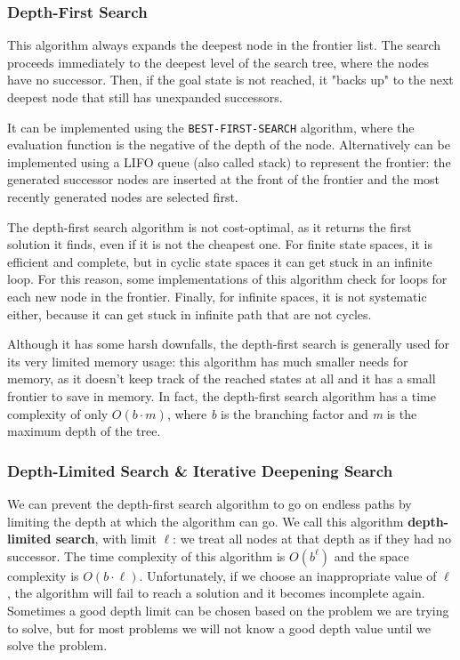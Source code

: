 \documentclass{article}
\begin{document}
\subsubsection{Depth-First Search}
This algorithm always expands the deepest node in the frontier list. The search proceeds immediately to the deepest level of the search tree, where the nodes have no successor. Then, if the goal state is not reached, it "backs up" to the next deepest node that still has unexpanded successors. 

It can be implemented using the \lstinline{BEST-FIRST-SEARCH} algorithm, where the evaluation function is the negative of the depth of the node. Alternatively can be implemented using a LIFO queue (also called stack) to represent the frontier: the generated successor nodes are inserted at the front of the frontier and the most recently generated nodes are selected first.

The depth-first search algorithm is not cost-optimal, as it returns the first solution it finds, even if it is not the cheapest one. For finite state spaces, it is efficient and complete, but in cyclic state spaces it can get stuck in an infinite loop. For this reason, some implementations of this algorithm check for loops for each new node in the frontier. Finally, for infinite spaces, it is not systematic either, because it can get stuck in infinite path that are not cycles.

Although it has some harsh downfalls, the depth-first search is generally used for its very limited memory usage: this algorithm has much smaller needs for memory, as it doesn't keep track of the reached states at all and it has a small frontier to save in memory. In fact, the depth-first search algorithm has a time complexity of only \(O(b\cdot m)\), where \textit{b} is the branching factor and \textit{m} is the maximum depth of the tree.

\subsubsection{Depth-Limited Search \& Iterative Deepening Search}
We can prevent the depth-first search algorithm to go on endless paths by limiting the depth at which the algorithm can go. We call this algorithm \textbf{depth-limited search}, with limit \(\ell\): we treat all nodes at that depth as if they had no successor. The time complexity of this algorithm is \(O(b^\ell)\) and the space complexity is \(O(b\cdot \ell)\). Unfortunately, if we choose an inappropriate value of \(\ell\), the algorithm will fail to reach a solution and it becomes incomplete again. Sometimes a good depth limit can be chosen based on the problem we are trying to solve, but for most problems we will not know a good depth value until we solve the problem.
\end{document}
